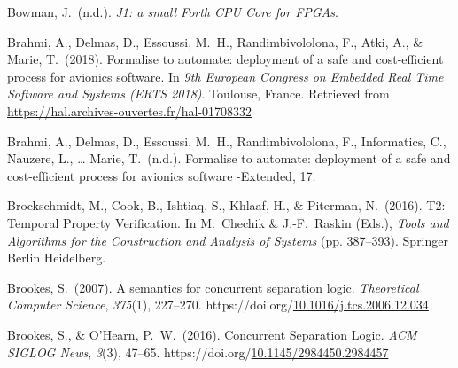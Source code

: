 \documentclass[12pt,twoside]{article}
\begin{document}
{\begin{thebibliography}{222}
\mdbibitemlabel{}Bowman, J.~(n.d.). \emph{J1: a small Forth CPU Core for FPGAs}.\label{bowman_j1:_nodate}%

\mdbibitemlabel{}Brahmi, A., Delmas, D., Essoussi, M.~H., Randimbivololona, F., Atki, A., \& Marie, T.~(2018). Formalise to automate: deployment of a safe and cost-efficient process for avionics software. In \emph{9th European Congress on Embedded Real Time Software and Systems (ERTS 2018)}. Toulouse, France. Retrieved from \href{https://hal.archives-ouvertes.fr/hal-01708332}{{\ttfamily https://\hspace{0pt}hal.\hspace{0pt}archives-\hspace{0pt}ouvertes.\hspace{0pt}fr/\hspace{0pt}hal-\hspace{0pt}01708332}}\label{brahmi_formalise_2018}%

\mdbibitemlabel{}Brahmi, A., Delmas, D., Essoussi, M.~H., Randimbivololona, F., Informatics, C., Nauzere, L., … Marie, T.~(n.d.). Formalise to automate: deployment of a safe and cost-efﬁcient process for avionics software -Extended, 17.\label{brahmi_formalise_nodate}%

\mdbibitemlabel{}Brockschmidt, M., Cook, B., Ishtiaq, S., Khlaaf, H., \& Piterman, N.~(2016). T2: Temporal Property Verification. In M.~Chechik \& J.-F.~Raskin (Eds.), \emph{Tools and Algorithms for the Construction and Analysis of Systems} (pp. 387–393). Springer Berlin Heidelberg.\label{brockschmidt_t2:_2016}%

\mdbibitemlabel{}Brookes, S.~(2007). A semantics for concurrent separation logic. \emph{Theoretical Computer Science}, \emph{375}(1), 227–270. https://doi.org/\href{https://dx.doi.org/10.1016/j.tcs.2006.12.034}{10.1016/j.tcs.2006.12.034}\label{brookes_semantics_2007}%

\mdbibitemlabel{}Brookes, S., \& O’Hearn, P.~W.~(2016). Concurrent Separation Logic. \emph{ACM SIGLOG News}, \emph{3}(3), 47–65. https://doi.org/\href{https://dx.doi.org/10.1145/2984450.2984457}{10.1145/2984450.2984457}\label{brookes_concurrent_2016}%


\end{thebibliography}}
\end{document}
